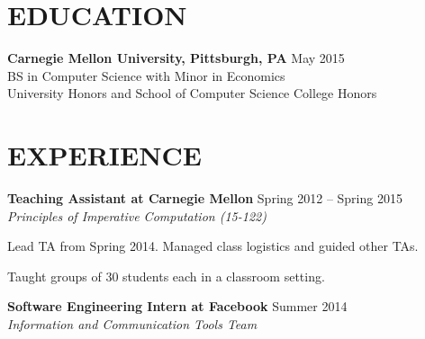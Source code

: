 \documentclass[margin, 11pt]{res} %
\begin{document}
\begin{resume}


\section{EDUCATION}

{\bf Carnegie Mellon University, Pittsburgh, PA} \hfill {\small May 2015}\\
{\small BS in Computer Science with Minor in Economics} \\
{\small University Honors and School of Computer Science College Honors}



\section{EXPERIENCE}

{\bf Teaching Assistant at Carnegie Mellon} \hfill {\small Spring 2012 -- Spring 2015}\\
{\small {\sl Principles of Imperative Computation (15-122)}}

\begin{itemize} \itemsep -2pt
{\small \item Lead TA from Spring 2014. Managed class logistics and guided other TAs.
\item Taught groups of 30 students each in a classroom setting.}
\end{itemize}

\vspace{3pt}

{\bf Software Engineering Intern at Facebook} \hfill {\small Summer 2014}\\
{\small {\sl Information and Communication Tools Team}}


\end{resume}
\end{document}
